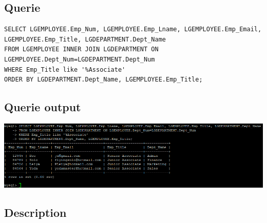 \documentclass[a4paper,10pt]{article}
\begin{document}
 \subsection{Querie}
          \lstset{
            language=SQL,
            breaklines=true
            }
        \begin{lstlisting}[frame=single]
        SELECT LGEMPLOYEE.Emp_Num, LGEMPLOYEE.Emp_Lname, LGEMPLOYEE.Emp_Email, LGEMPLOYEE.Emp_Title, LGDEPARTMENT.Dept_Name
FROM LGEMPLOYEE INNER JOIN LGDEPARTMENT ON LGEMPLOYEE.Dept_Num=LGDEPARTMENT.Dept_Num
WHERE Emp_Title like '%Associate'
ORDER BY LGDEPARTMENT.Dept_Name, LGEMPLOYEE.Emp_Title;

        \end{lstlisting}
\subsection{Querie output}
           \includegraphics{Queries/Question_9/Question_9_screenshot.PNG}
\subsection{Description}
\end{document}
